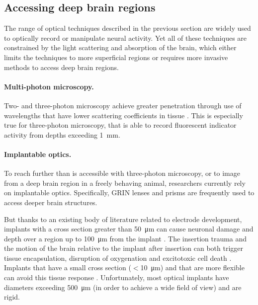\subsection{Accessing deep brain regions}

The range of optical techniques described in the previous 
section are widely used to optically record or manipulate 
neural activity. Yet all of these techniques are constrained 
by the light scattering and absorption of the brain, which 
either limits the techniques to more superficial regions or 
requires more invasive methods to access deep brain regions.

\paragraph{Multi-photon microscopy.} Two- and three-photon 
microscopy achieve greater penetration through use of 
wavelengths that have lower scattering coefficients in 
tissue \cite{Wang:2017jp}. This is especially true for 
three-photon microscopy, that is able to record 
fluorescent indicator activity from depths exceeding 1~mm.

\paragraph{Implantable optics.} To reach further than 
is accessible with three-photon microscopy, or to image 
from a deep brain region in a freely behaving animal, 
researchers currently rely on implantable optics. 
Specifically, GRIN lenses \cite{Barretto:2009hk} and 
prisms \cite{Andermann:2013kc} are frequently used to 
access deeper brain structures.

But thanks to an existing body of literature related to 
electrode development, implants with a cross section 
greater than 50~\si{\micro\meter} can cause neuronal 
damage and depth over a region up to 100~\si{\micro\meter}
from the implant \cite{Seymour:2007dj}. The insertion 
trauma and the motion of the brain relative to the implant 
after insertion can both trigger tissue encapsulation, 
disruption of oxygenation and  excitotoxic cell death
\cite{Szarowski:2003cz,Polikov:2005cq,McConnell:2009hr,Freire:2011gl}.
Implants that have a small cross section ($<$10~\si{\micro\meter}) 
and that are more flexible can avoid this tissue response 
\cite{JohnPSeymour:2006td,Harris:2011dy,Kozai:2012bp,Patel:2018cr}.
Unfortunately, most optical implants have diameters exceeding 
500~\si{\micro\meter} (in order to achieve a wide field of view) 
and are rigid.


